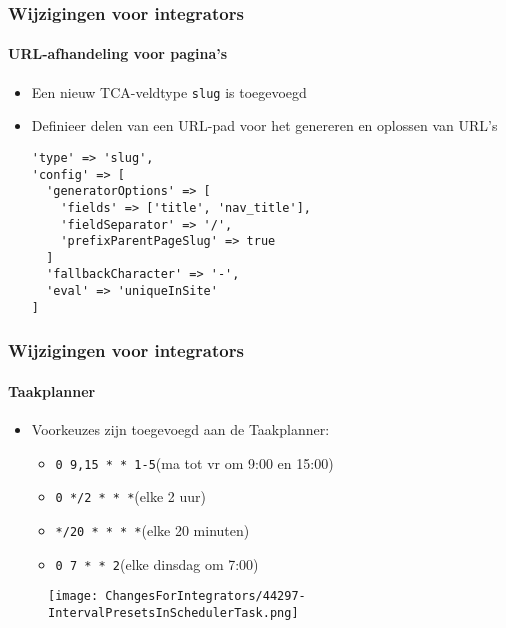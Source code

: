 \begin{frame}[fragile]
	\frametitle{Wijzigingen voor integrators}
	\framesubtitle{URL-afhandeling voor pagina's}

	\lstset{basicstyle=\smaller\ttfamily}

	\begin{itemize}
		\item Een nieuw TCA-veldtype \texttt{slug} is toegevoegd
		\item Definieer delen van een URL-pad voor het genereren en oplossen van URL's

		\begin{lstlisting}
'type' => 'slug',
'config' => [
  'generatorOptions' => [
    'fields' => ['title', 'nav_title'],
    'fieldSeparator' => '/',
    'prefixParentPageSlug' => true
  ]
  'fallbackCharacter' => '-',
  'eval' => 'uniqueInSite'
]
		\end{lstlisting}
	\end{itemize}

\end{frame}


\begin{frame}[fragile]
	\frametitle{Wijzigingen voor integrators}
	\framesubtitle{Taakplanner}

	\begin{itemize}
		\item Voorkeuzes zijn toegevoegd aan de Taakplanner:

			\begin{itemize}
				\item \texttt{0 9,15 * * 1-5}\tabto{3.8cm}(ma tot vr om 9:00 en 15:00)
				\item \texttt{0 */2 * * *}\tabto{3.8cm}(elke 2 uur)
				\item \texttt{*/20 * * * *}\tabto{3.8cm}(elke 20 minuten)
				\item \texttt{0 7 * * 2}\tabto{3.8cm}(elke dinsdag om 7:00)
			\end{itemize}

	\end{itemize}

	\begin{figure}
		\texttt{[image: ChangesForIntegrators/44297-IntervalPresetsInSchedulerTask.png]}
	\end{figure}

\end{frame}

